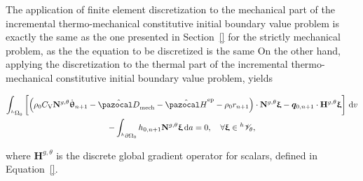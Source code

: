The application of finite element discretization to the mechanical part of the incremental thermo-mechanical constitutive initial boundary value problem is exactly the same as the one presented in Section~\ref{} for the strictly mechanical problem, as the the equation to be discretized is the same
On the other hand, applying the discretization to the thermal part of the incremental thermo-mechanical constitutive initial boundary value problem, yields
\begin{highlight}[innertopmargin=-5pt]
    \begin{multline}
    \int_{^h\Omega_0}   \left[\left(\rho_0C_\mathrm{V}\mathbf N^{g,\theta} \dot{\bm\uptheta}_{n+1} -\hat{\pazocal D}_\text{mech} - \hat{\pazocal H}^\text{ep}- \rho_0 r_{n+1} \right) \cdot \mathbf N^{g,\theta}\bm{\upxi} - \bm q_{0,n+1}\cdot \mathbf H^{g,\theta} \bm{\upxi}\right]\ud v \\- \int_{^h\partial\Omega_0} h_{0,n+1} \mathbf N^{g,\theta}\bm{\upxi}\ud a = 0,\quad \forall \bm{\upxi} \in {}^h\mathscr{V}_{\theta}, \label{eq:thermo_mech_thermo_fem_disc}
    \end{multline}
\end{highlight}
where $\mathbf H^{g,\theta}$ is the discrete global gradient operator for scalars, defined in Equation~\eqref{}.

